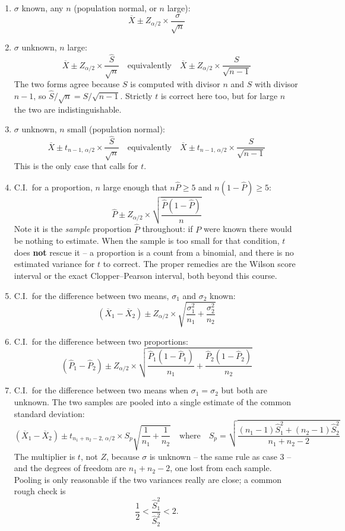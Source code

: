 \documentclass[11pt,a4paper]{article}
\theoremstyle{definition}
\begin{document}
\begin{enumerate}
\item $\sigma$ known, any $n$ (population normal, or $n$ large):
\[\overline{X}\pm Z_{\alpha/2}\times \frac{\sigma}{\sqrt{n}}\]

\item $\sigma$ unknown, $n$ large:
\[\overline{X}\pm Z_{\alpha/2}\times \frac{\hat{S}}{\sqrt{n}}
\quad \text{equivalently}\quad 
\overline{X}\pm Z_{\alpha/2}\times \frac{S}{\sqrt{n-1}}\]
The two forms agree because $S$ is computed with divisor $n$ and $\hat{S}$ with
divisor $n-1$, so $\hat{S}/\sqrt{n}=S/\sqrt{n-1}$. Strictly $t$ is correct here too,
but for large $n$ the two are indistinguishable.

\item $\sigma$ unknown, $n$ small (population normal):
\[\overline{X}\pm t_{n-1,\,\alpha/2}\times \frac{\hat{S}}{\sqrt{n}}
\quad \text{equivalently}\quad 
\overline{X}\pm t_{n-1,\,\alpha/2}\times \frac{S}{\sqrt{n-1}}\]
This is the only case that calls for $t$.

\item C.I.\ for a proportion, $n$ large enough that $n\hat{P}\geq 5$ and
$n(1-\hat{P})\geq 5$:
\[\hat{P}\pm Z_{\alpha/2}\times \sqrt{\frac{\hat{P}(1-\hat{P})}{n}}\]
Note it is the \emph{sample} proportion $\hat{P}$ throughout: if $P$ were known there
would be nothing to estimate. When the sample is too small for that condition, $t$ does
\textbf{not} rescue it -- a proportion is a count from a binomial, and there is no
estimated variance for $t$ to correct. The proper remedies are the Wilson score interval
or the exact Clopper--Pearson interval, both beyond this course.

\item C.I.\ for the difference between two means, $\sigma_1$ and $\sigma_2$ known:
\[(\overline{X}_1-\overline{X}_2)\pm Z_{\alpha/2}\times
\sqrt{\frac{\sigma_1^2}{n_1}+\frac{\sigma_2^2}{n_2}}\]

\item C.I.\ for the difference between two proportions:
\[(\hat{P}_1-\hat{P}_2)\pm Z_{\alpha/2}\times
\sqrt{\frac{\hat{P}_1(1-\hat{P}_1)}{n_1}+\frac{\hat{P}_2(1-\hat{P}_2)}{n_2}}\]

\item C.I.\ for the difference between two means when $\sigma_1=\sigma_2$ but both are
unknown. The two samples are pooled into a single estimate of the common standard
deviation:
\[(\overline{X}_1-\overline{X}_2)\pm t_{n_1+n_2-2,\,\alpha/2}\times
S_p\sqrt{\frac{1}{n_1}+\frac{1}{n_2}}
\quad \text{where}\quad 
S_p=\sqrt{\frac{(n_1-1)\hat{S}^2_1+(n_2-1)\hat{S}^2_2}{n_1+n_2-2}}\]
The multiplier is $t$, not $Z$, because $\sigma$ is unknown -- the same rule as case 3 --
and the degrees of freedom are $n_1+n_2-2$, one lost from each sample. Pooling is only
reasonable if the two variances really are close; a common rough check is
\[\frac{1}{2}<\frac{\hat{S}^2_1}{\hat{S}^2_2}<2.\]


\end{enumerate}
\end{document}
